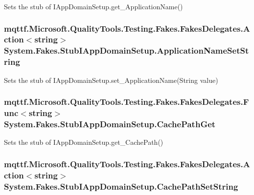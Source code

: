 Sets the stub of I\-App\-Domain\-Setup.\-get\-\_\-\-Application\-Name()

\hypertarget{class_system_1_1_fakes_1_1_stub_i_app_domain_setup_a72d895b68591832f8f4b5f1532558c52}{
\subsubsection[{Application\-Name\-Set\-String}]{\setlength{\rightskip}{0pt plus 5cm}mqttf.\-Microsoft.\-Quality\-Tools.\-Testing.\-Fakes.\-Fakes\-Delegates.\-Action$<$string$>$ System.\-Fakes.\-Stub\-I\-App\-Domain\-Setup.\-Application\-Name\-Set\-String}}\label{class_system_1_1_fakes_1_1_stub_i_app_domain_setup_a72d895b68591832f8f4b5f1532558c52}


Sets the stub of I\-App\-Domain\-Setup.\-set\-\_\-\-Application\-Name(\-String value)

\hypertarget{class_system_1_1_fakes_1_1_stub_i_app_domain_setup_a795a73390875e94d9958f79a9c26921c}{
\subsubsection[{Cache\-Path\-Get}]{\setlength{\rightskip}{0pt plus 5cm}mqttf.\-Microsoft.\-Quality\-Tools.\-Testing.\-Fakes.\-Fakes\-Delegates.\-Func$<$string$>$ System.\-Fakes.\-Stub\-I\-App\-Domain\-Setup.\-Cache\-Path\-Get}}\label{class_system_1_1_fakes_1_1_stub_i_app_domain_setup_a795a73390875e94d9958f79a9c26921c}


Sets the stub of I\-App\-Domain\-Setup.\-get\-\_\-\-Cache\-Path()

\hypertarget{class_system_1_1_fakes_1_1_stub_i_app_domain_setup_acd02e201f2d7a11c5b72337a9e6eedc7}{
\subsubsection[{Cache\-Path\-Set\-String}]{\setlength{\rightskip}{0pt plus 5cm}mqttf.\-Microsoft.\-Quality\-Tools.\-Testing.\-Fakes.\-Fakes\-Delegates.\-Action$<$string$>$ System.\-Fakes.\-Stub\-I\-App\-Domain\-Setup.\-Cache\-Path\-Set\-String}}\label{class_system_1_1_fakes_1_1_stub_i_app_domain_setup_acd02e201f2d7a11c5b72337a9e6eedc7}


